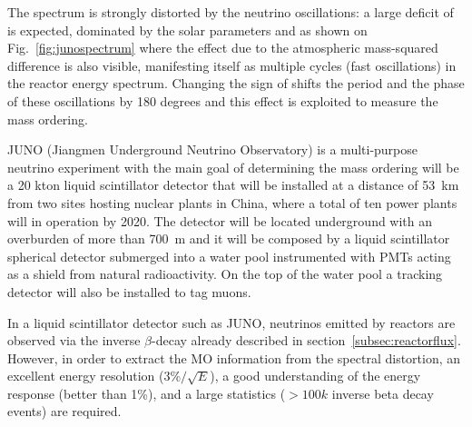 The spectrum is strongly distorted by the neutrino oscillations: a large deficit of \nueb is expected, dominated by the solar parameters \thsol and \dmsqso as shown on Fig.~\ref{fig:junospectrum} where the effect due to the atmospheric mass-squared difference is also visible, manifesting itself as multiple cycles (fast oscillations) in the reactor energy spectrum. 
Changing the sign of \dmsq shifts the period and the phase of these oscillations by 180 degrees and this effect is exploited to measure the mass ordering.


JUNO (Jiangmen Underground Neutrino Observatory) is a multi-purpose neutrino experiment with the main goal of determining the mass ordering will be a 20 kton liquid scintillator detector that will be installed at a distance of 53~km from two sites hosting nuclear plants in China, where a total of ten power plants will in operation by 2020. The detector will be located underground with an overburden of more than 700~m and it will be composed by a liquid scintillator spherical detector submerged into a water pool instrumented with PMTs acting as a shield from natural radioactivity. On the top of the water pool a tracking detector will also be installed to tag muons. 

In a liquid scintillator detector such as JUNO, neutrinos emitted by reactors are observed via the inverse $\beta$-decay already described in section~\ref{subsec:reactorflux}. 
However, in order to extract the MO information from the spectral distortion, an excellent energy resolution ($3\%/ \sqrt{E}$), a good understanding of the energy response (better than 1\%), and a large statistics ($>100k$ inverse beta decay events) are required.
 
